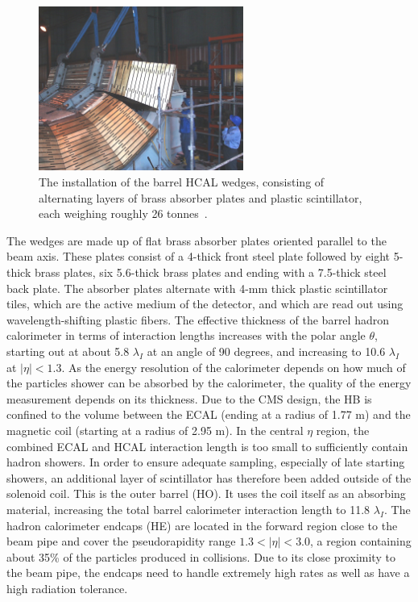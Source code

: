 \begin{figure}[h] 
    \centering
    \includegraphics[width=0.6\textwidth]{figures/cms/hcal-2000-010_02.jpg}
    \caption{The installation of the barrel HCAL wedges, consisting of alternating layers of brass absorber plates and plastic scintillator, each weighing roughly 26 tonnes~\cite{Veillet:41645}.}
    \label{fig:cms:hcal-wedges}
\end{figure}
The wedges are made up of flat brass absorber plates oriented parallel to the beam axis. These plates consist of a 4-\cm thick front steel plate followed by eight 5-\cm thick brass plates, six 5.6-\cm thick brass plates and ending with a 7.5-\cm thick steel back plate. The absorber plates alternate with 4-mm thick plastic scintillator tiles, which are the active medium of the detector, and which are read out using wavelength-shifting plastic fibers. The effective thickness of the barrel hadron calorimeter in terms of interaction lengths increases with the polar angle $\theta$, starting out at about 5.8 $\lambda_I$ at an angle of 90 degrees, and increasing to 10.6 $\lambda_I$ at $|\eta|<1.3$.
As the energy resolution of the calorimeter depends on how much of the particles shower can be absorbed by the calorimeter, the quality of the energy measurement depends on its thickness. Due to the CMS design, the HB is confined to the volume between the ECAL (ending at a radius of 1.77 m) and the magnetic coil (starting at a radius of 2.95 m).
In the central $\eta$ region, the combined ECAL and HCAL interaction length is too small to sufficiently contain hadron showers. 
In order to ensure adequate sampling, especially of late starting showers, an additional layer of scintillator has therefore been added outside of the solenoid coil. This is the outer barrel (HO). It uses the coil itself as an absorbing material, increasing the total barrel calorimeter interaction length to 11.8 $\lambda_I$.
The hadron calorimeter endcaps (HE) are located in the forward region close to the beam pipe and cover the pseudorapidity range $1.3 < |\eta|< 3.0$, a region containing about 35\% of the particles produced in collisions. Due to its close proximity to the beam pipe, the endcaps need to handle extremely high rates as well as have a high radiation tolerance.
